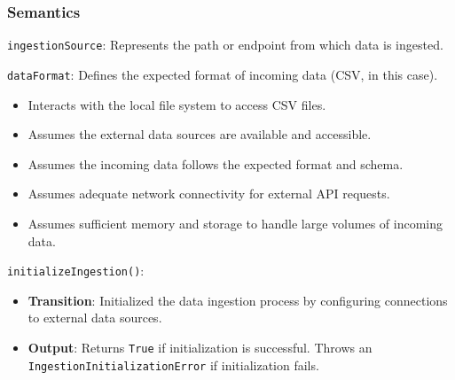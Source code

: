 \documentclass[12pt, titlepage]{article}
\begin{document}
\begin{description}
\subsubsection{Semantics}
\begin{description}
  \item[State Variables:]
  \item
  \texttt{ingestionSource}: Represents the path or endpoint from which data is ingested.
  \item
  \texttt{dataFormat}: Defines the expected format of incoming data (CSV, in this case).

  \item[Environment Variables:]
  \item
  \begin{itemize}
    \item Interacts with the local file system to access CSV files.
  \end{itemize}

  \item[Assumptions:]
  \item
  \begin{itemize}
    \item Assumes the external data sources are available and accessible.
  \end{itemize}
  \item
  \begin{itemize}
    \item Assumes the incoming data follows the expected format and schema.
  \end{itemize}
  \item 
  \begin{itemize}
    \item Assumes adequate network connectivity for external API requests.
  \end{itemize}
  \item
  \begin{itemize}
    \item Assumes sufficient memory and storage to handle large volumes of incoming data.
  \end{itemize}

  \item[Access Routine Semantics:] 
  \item
  \texttt{initializeIngestion()}:
  \item
  \begin{itemize}
    \item \textbf{Transition}: Initialized the data ingestion process by configuring connections to
    external data sources.
  \end{itemize}
  \item
  \begin{itemize}
    \item \textbf{Output}: Returns \texttt{True} if initialization is successful. Throws an
    \\ \texttt{IngestionInitializationError} if initialization fails.
  \end{itemize}
  \item 


\end{description}
\end{description}
\end{document}
